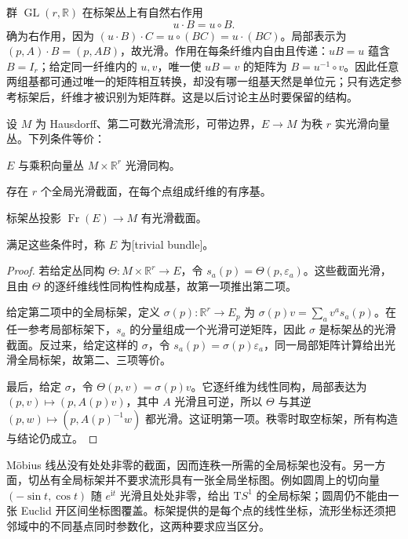 \ProseParagraphBreak

群 \(\operatorname{GL}(r,\mathbb R)\) 在标架丛上有自然右作用
\begin{equation}
	\label{g1:eq:frame-bundle-right-action}
	u\cdot B=u\circ B.
\end{equation}
确为右作用，因为 \((u\cdot B)\cdot C=u\circ(BC)=u\cdot(BC)\)。局部表示为 \((p,A)\cdot B=(p,AB)\)，故光滑。作用在每条纤维内自由且传递：\(uB=u\) 蕴含 \(B=I_r\)；给定同一纤维内的 \(u,v\)，唯一使 \(uB=v\) 的矩阵为 \(B=u^{-1}\circ v\)。因此任意两组基都可通过唯一的矩阵相互转换，却没有哪一组基天然是单位元；只有选定参考标架后，纤维才被识别为矩阵群。这是以后讨论主丛时要保留的结构。

\begin{proposition}
	\label{g1:prop:global-frame-triviality}
	设 \(M\) 为 Hausdorff、第二可数光滑流形，可带边界，\(E\to M\) 为秩 \(r\) 实光滑向量丛。下列条件等价：
	\begin{equivalences}
		\item \(E\) 与乘积向量丛 \(M\times\mathbb R^r\) 光滑同构。
		\item 存在 \(r\) 个全局光滑截面，在每个点组成纤维的有序基。
		\item 标架丛投影 \(\operatorname{Fr}(E)\to M\) 有光滑截面。
	\end{equivalences}
	满足这些条件时，称 \(E\) 为[trivial bundle]。
\end{proposition}
\begin{proof}
	若给定丛同构 \(\Theta:M\times\mathbb R^r\to E\)，令 \(s_a(p)=\Theta(p,\varepsilon_a)\)。这些截面光滑，且由 \(\Theta\) 的逐纤维线性同构性构成基，故第一项推出第二项。

	给定第二项中的全局标架，定义 \(\sigma(p):\mathbb R^r\to E_p\) 为 \(\sigma(p)v=\sum_a v^a s_a(p)\)。在任一参考局部标架下，\(s_a\) 的分量组成一个光滑可逆矩阵，因此 \(\sigma\) 是标架丛的光滑截面。反过来，给定这样的 \(\sigma\)，令 \(s_a(p)=\sigma(p)\varepsilon_a\)，同一局部矩阵计算给出光滑全局标架，故第二、三项等价。

	最后，给定 \(\sigma\)，令 \(\Theta(p,v)=\sigma(p)v\)。它逐纤维为线性同构，局部表达为 \((p,v)\mapsto(p,A(p)v)\)，其中 \(A\) 光滑且可逆，所以 \(\Theta\) 与其逆 \((p,w)\mapsto(p,A(p)^{-1}w)\) 都光滑。这证明第一项。秩零时取空标架，所有构造与结论仍成立。
\end{proof}

Möbius 线丛没有处处非零的截面，因而连秩一所需的全局标架也没有。另一方面，切丛有全局标架并不要求流形具有一张全局坐标图。例如圆周上的切向量 \((-\sin t,\cos t)\) 随 \(e^{\mathrm{i}t}\) 光滑且处处非零，给出 \(\mathrm{T}S^1\) 的全局标架；圆周仍不能由一张 Euclid 开区间坐标图覆盖。标架提供的是每个点的线性坐标，流形坐标还须把邻域中的不同基点同时参数化，这两种要求应当区分。
